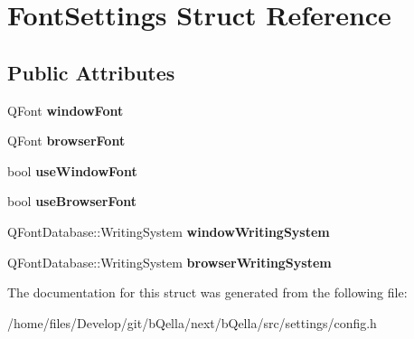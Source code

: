 \hypertarget{structFontSettings}{
\section{FontSettings Struct Reference}
\label{structFontSettings}
}
\subsection*{Public Attributes}
\begin{DoxyCompactItemize}
\item 
\hypertarget{structFontSettings_ad4b666de35d008bbb17c3ff9c3c17ddf}{
QFont {\bfseries windowFont}}
\label{structFontSettings_ad4b666de35d008bbb17c3ff9c3c17ddf}

\item 
\hypertarget{structFontSettings_a70bc77ada43f8be137a2b02931987d64}{
QFont {\bfseries browserFont}}
\label{structFontSettings_a70bc77ada43f8be137a2b02931987d64}

\item 
\hypertarget{structFontSettings_a2bc91b321cfcbd76ee511d0e84f74879}{
bool {\bfseries useWindowFont}}
\label{structFontSettings_a2bc91b321cfcbd76ee511d0e84f74879}

\item 
\hypertarget{structFontSettings_afcbff97bee92c06108852777f354d6b5}{
bool {\bfseries useBrowserFont}}
\label{structFontSettings_afcbff97bee92c06108852777f354d6b5}

\item 
\hypertarget{structFontSettings_aa3f50f4e516371204510c98ec728a67e}{
QFontDatabase::WritingSystem {\bfseries windowWritingSystem}}
\label{structFontSettings_aa3f50f4e516371204510c98ec728a67e}

\item 
\hypertarget{structFontSettings_ac46cbafa59c51580560f089b6bc42a13}{
QFontDatabase::WritingSystem {\bfseries browserWritingSystem}}
\label{structFontSettings_ac46cbafa59c51580560f089b6bc42a13}

\end{DoxyCompactItemize}


The documentation for this struct was generated from the following file:\begin{DoxyCompactItemize}
\item 
/home/files/Develop/git/bQella/next/bQella/src/settings/config.h\end{DoxyCompactItemize}

